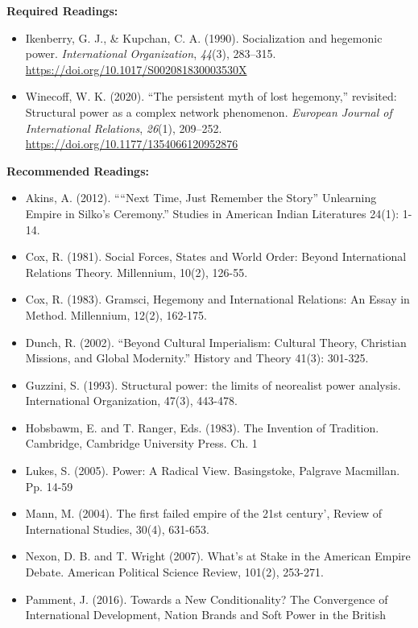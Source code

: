 \documentclass[
  letterpaper,
  DIV=11,
  numbers=noendperiod]{scrartcl}
\providecommand{\tightlist}{%
  \setlength{\itemsep}{0pt}\setlength{\parskip}{0pt}}\usepackage{longtable,booktabs,array}
\begin{document}
\textbf{Required Readings:}

\begin{itemize}
\tightlist
\item
  Ikenberry, G. J., \& Kupchan, C. A. (1990). Socialization and
  hegemonic power. \emph{International Organization}, \emph{44}(3),
  283--315. \url{https://doi.org/10.1017/S002081830003530X}
\item
  Winecoff, W. K. (2020). {``The persistent myth of lost hegemony,''}
  revisited: Structural power as a complex network phenomenon.
  \emph{European Journal of International Relations}, \emph{26}(1),
  209--252. \url{https://doi.org/10.1177/1354066120952876}
\end{itemize}

\textbf{Recommended Readings:}

\begin{itemize}
\tightlist
\item
  Akins, A. (2012). ````Next Time, Just Remember the Story'' Unlearning
  Empire in Silko's Ceremony.'' Studies in American Indian Literatures
  24(1): 1-14.
\item
  Cox, R. (1981). Social Forces, States and World Order: Beyond
  International Relations Theory. Millennium, 10(2), 126-55.
\item
  Cox, R. (1983). Gramsci, Hegemony and International Relations: An
  Essay in Method. Millennium, 12(2), 162-175.
\item
  Dunch, R. (2002). ``Beyond Cultural Imperialism: Cultural Theory,
  Christian Missions, and Global Modernity.'' History and Theory 41(3):
  301-325.
\item
  Guzzini, S. (1993). Structural power: the limits of neorealist power
  analysis. International Organization, 47(3), 443-478.
\item
  Hobsbawm, E. and T. Ranger, Eds. (1983). The Invention of Tradition.
  Cambridge, Cambridge University Press. Ch. 1
\item
  Lukes, S. (2005). Power: A Radical View. Basingstoke, Palgrave
  Macmillan. Pp. 14-59
\item
  Mann, M. (2004). The first failed empire of the 21st century', Review
  of International Studies, 30(4), 631-653.
\item
  Nexon, D. B. and T. Wright (2007). What's at Stake in the American
  Empire Debate. American Political Science Review, 101(2), 253-271.
\item
  Pamment, J. (2016). Towards a New Conditionality? The Convergence of
  International Development, Nation Brands and Soft Power in the British

\end{itemize}
\end{document}
